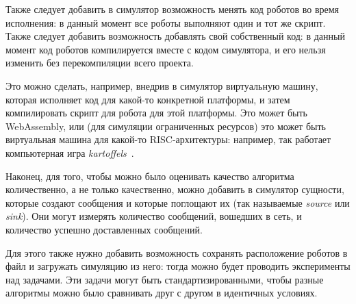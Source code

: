 \documentclass[%
]{report}
\begin{document}
Также следует добавить в симулятор
возможность менять код роботов во время исполнения:
в данный момент все роботы выполняют один и тот же скрипт.
Также следует добавить возможность добавлять свой собственный код:
в данный момент код роботов компилируется вместе с кодом симулятора,
и его нельзя изменить без перекомпиляции всего проекта.

Это можно сделать, например,
внедрив в симулятор виртуальную машину,
которая исполняет код для какой-то конкретной платформы,
и затем компилировать скрипт для робота для этой платформы.
Это может быть WebAssembly,
или (для симуляции ограниченных ресурсов)
это может быть виртуальная машина для какой-то RISC-архитектуры:
например, так работает компьютерная игра \emph{kartoffels}~\cite{kartoffels}.

Наконец, для того, чтобы можно было оценивать качество алгоритма
количественно, а не только качественно,
можно добавить в симулятор
сущности,
которые создают сообщения
и которые поглощают их
(так называемые \emph{source} или \emph{sink}).
Они могут измерять количество сообщений,
вошедших в сеть,
и количество успешно доставленных сообщений.

Для этого также нужно добавить возможность сохранять расположение роботов
в файл и загружать симуляцию из него:
тогда можно будет проводить эксперименты
над задачами.
Эти задачи могут быть стандартизированными,
чтобы разные алгоритмы можно было сравнивать друг с другом
в идентичных условиях.






\end{document}
